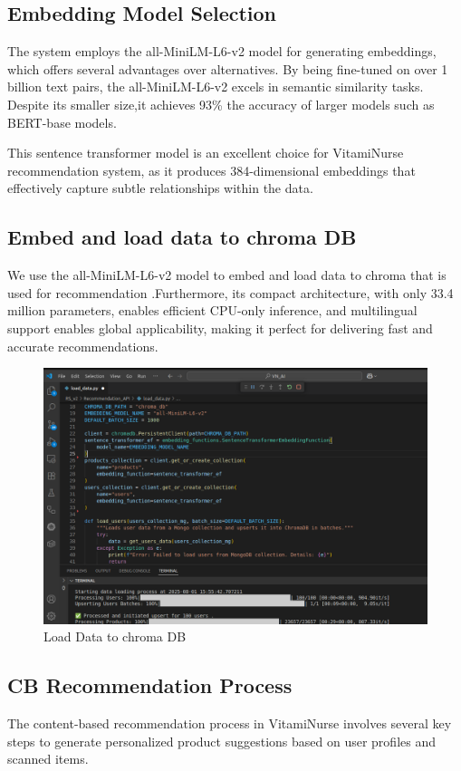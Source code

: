 \subsection{Embedding Model Selection}
The system employs the all-MiniLM-L6-v2 model for generating embeddings, which offers several advantages over alternatives. 
By being fine-tuned on over 1 billion text pairs, the all-MiniLM-L6-v2 excels in semantic similarity tasks. 
Despite its smaller size,it achieves 93\% the accuracy of larger models such as BERT-base models.
\par This sentence transformer model is an excellent choice for VitamiNurse recommendation system, as it produces 384-dimensional embeddings that effectively capture subtle relationships within the data. \cite{sentence-transformers-all-MiniLM-L12-v2}


\subsection{Embed and load data to chroma DB}
We use the all-MiniLM-L6-v2 model to embed and load data to chroma that is used for recommendation .Furthermore, its compact architecture, with only 33.4 million parameters, enables efficient CPU-only inference, and multilingual support enables global applicability, making it perfect for delivering fast and accurate recommendations.
\begin{figure}[H]
    \centering
    \includegraphics[scale=0.39]{images/load_data__0.png}
    \caption{Load Data to chroma DB} 
    \label{fig:load data chroma}
\end{figure}

\subsection{CB Recommendation Process}
 The content-based recommendation process in VitamiNurse involves several key steps to generate personalized product suggestions based on user profiles and scanned items.
